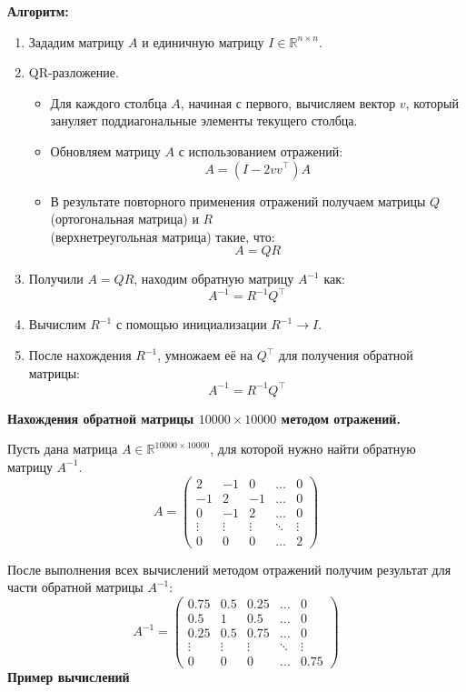 \documentclass[14pt]{report}
\begin{document}
\textbf{Алгоритм:}
\begin{enumerate}

    \item Зададим матрицу \( A \) и единичную матрицу \( I \in \mathbb{R}^{n \times n} \).

    \item QR-разложение.
        \begin{itemize}
            \item Для каждого столбца \( A \), начиная с первого, вычисляем вектор \( v \), который зануляет поддиагональные элементы текущего столбца.
            \item Обновляем матрицу \( A \) с использованием отражений:
            \[
            A = (I - 2vv^\top)A
            \]
            \item В результате повторного применения отражений получаем матрицы \( Q \) (ортогональная матрица) и \( R \) \\(верхнетреугольная матрица) такие, что:
            \[
            A = QR
            \]
        \end{itemize}

    \item Получили \( A = QR \), находим обратную матрицу \( A^{-1} \) как:
    \[
    A^{-1} = R^{-1} Q^\top
    \]

    \item Вычислим \( R^{-1} \) с помощью инициализации $R^{-1} \rightarrow I.$

    \item После нахождения $R^{-1}$, умножаем её на $Q^{\top}$ для получения обратной матрицы:
            \[ A^{-1} = R^{-1} Q^{\top} \]

\end{enumerate}


\textbf{Нахождения обратной матрицы \( 10000 \times 10000 \) методом отражений.}

Пусть дана матрица \( A \in \mathbb{R}^{10000 \times 10000} \), для которой нужно найти обратную матрицу \( A^{-1} \).
\[
A = \begin{pmatrix}
2 & -1 & 0 & \dots & 0 \\
-1 & 2 & -1 & \dots & 0 \\
0 & -1 & 2 & \dots & 0 \\
\vdots & \vdots & \vdots & \ddots & \vdots \\
0 & 0 & 0 & \dots & 2
\end{pmatrix}
\]

После выполнения всех вычислений методом отражений получим результат для части обратной матрицы \( A^{-1} \):
\[
A^{-1} = \begin{pmatrix}
0.75 & 0.5 & 0.25 & \dots & 0 \\
0.5 & 1 & 0.5 & \dots & 0 \\
0.25 & 0.5 & 0.75 & \dots & 0 \\
\vdots & \vdots & \vdots & \ddots & \vdots \\
0 & 0 & 0 & \dots & 0.75
\end{pmatrix}
\]
\newpage
\textbf{Пример вычислений}
\end{document}
